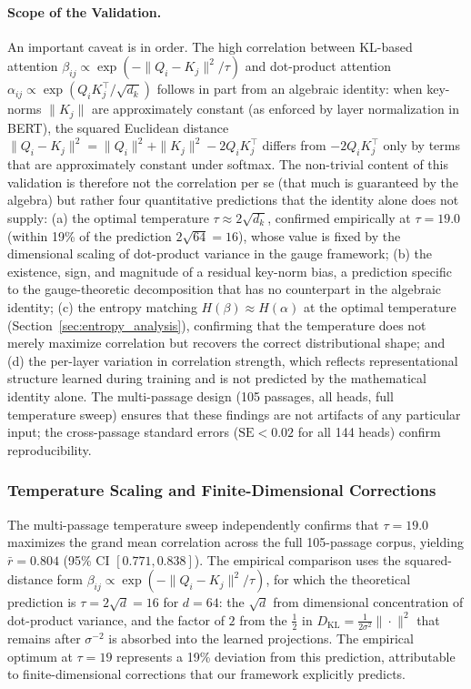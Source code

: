 \documentclass[twoside,11pt]{article}
\begin{document}
\paragraph{Scope of the Validation.}
An important caveat is in order. The high correlation between KL-based attention $\beta_{ij} \propto \exp(-\|Q_i - K_j\|^2/\tau)$ and dot-product attention $\alpha_{ij} \propto \exp(Q_i K_j^\top / \sqrt{d_k})$ follows in part from an algebraic identity: when key-norms $\|K_j\|$ are approximately constant (as enforced by layer normalization in BERT), the squared Euclidean distance $\|Q_i - K_j\|^2 = \|Q_i\|^2 + \|K_j\|^2 - 2Q_i K_j^\top$ differs from $-2Q_i K_j^\top$ only by terms that are approximately constant under softmax. The non-trivial content of this validation is therefore not the correlation per se (that much is guaranteed by the algebra) but rather four quantitative predictions that the identity alone does not supply: (a) the optimal temperature $\tau \approx 2\sqrt{d_k}$, confirmed empirically at $\tau = 19.0$ (within 19\% of the prediction $2\sqrt{64} = 16$), whose value is fixed by the dimensional scaling of dot-product variance in the gauge framework; (b) the existence, sign, and magnitude of a residual key-norm bias, a prediction specific to the gauge-theoretic decomposition that has no counterpart in the algebraic identity; (c) the entropy matching $H(\beta) \approx H(\alpha)$ at the optimal temperature (Section~\ref{sec:entropy_analysis}), confirming that the temperature does not merely maximize correlation but recovers the correct distributional shape; and (d) the per-layer variation in correlation strength, which reflects representational structure learned during training and is not predicted by the mathematical identity alone. The multi-passage design (105 passages, all heads, full temperature sweep) ensures that these findings are not artifacts of any particular input; the cross-passage standard errors ($\mathrm{SE} < 0.02$ for all 144 heads) confirm reproducibility.

\subsubsection{Temperature Scaling and Finite-Dimensional Corrections}
\label{sec:temperature_scaling}

The multi-passage temperature sweep independently confirms that $\tau = 19.0$ maximizes the grand mean correlation across the full 105-passage corpus, yielding $\bar{r} = 0.804$ (95\% CI $[0.771, 0.838]$). The empirical comparison uses the squared-distance form $\beta_{ij} \propto \exp(-\|Q_i - K_j\|^2/\tau)$, for which the theoretical prediction is $\tau = 2\sqrt{d} = 16$ for $d = 64$: the $\sqrt{d}$ from dimensional concentration of dot-product variance, and the factor of $2$ from the $\frac{1}{2}$ in $D_{\mathrm{KL}} = \frac{1}{2\sigma^2}\|\cdot\|^2$ that remains after $\sigma^{-2}$ is absorbed into the learned projections. The empirical optimum at $\tau = 19$ represents a 19\% deviation from this prediction, attributable to finite-dimensional corrections that our framework explicitly predicts.
\end{document}
